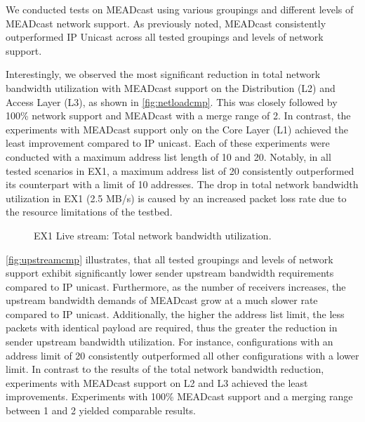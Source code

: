 We conducted tests on MEADcast using various groupings and different levels of
    MEADcast network support.
As previously noted, MEADcast consistently outperformed IP Unicast across all
    tested groupings and levels of network support.

Interestingly, we observed the most significant reduction in total network
    bandwidth utilization with MEADcast support on the Distribution (L2) and
    Access Layer (L3), as shown in \autoref{fig:netloadcmp}.
This was closely followed by 100\% network support and MEADcast with a merge 
    range of 2.
In contrast, the experiments with MEADcast support only on the Core Layer (L1)
    achieved the least improvement compared to IP unicast.
Each of these experiments were conducted with a maximum address list length of
    10 and 20.
Notably, in all tested scenarios in EX1, a maximum address list of 20
    consistently outperformed its counterpart with a limit of 10 addresses.
The drop in total network bandwidth utilization in EX1 (2.5 MB/s) is caused by
    an increased packet loss rate due to the resource limitations of the
    testbed.

\begin{figure}
    \begin{center}
        
    \end{center}
    \caption[EX1 Live stream: Total network bandwidth utilization]{
        EX1 Live stream: Total network bandwidth utilization.}
    \label{fig:netloadcmp}
\end{figure}

\autoref{fig:upstreamcmp} illustrates, that all tested groupings and levels of
    network support exhibit significantly lower sender upstream bandwidth
    requirements compared to IP unicast.
Furthermore, as the number of receivers increases, the upstream bandwidth
    demands of MEADcast grow at a much slower rate compared to IP unicast.
Additionally, the higher the address list limit, the less packets with
    identical payload are required, thus the greater the reduction in sender
    upstream bandwidth utilization.
For instance, configurations with an address limit of 20 consistently
    outperformed all other configurations with a lower limit.
In contrast to the results of the total network bandwidth reduction,
    experiments with MEADcast support on L2 and L3 achieved the least
    improvements.
Experiments with 100\% MEADcast support and a merging range between 1 and 2
    yielded comparable results.

